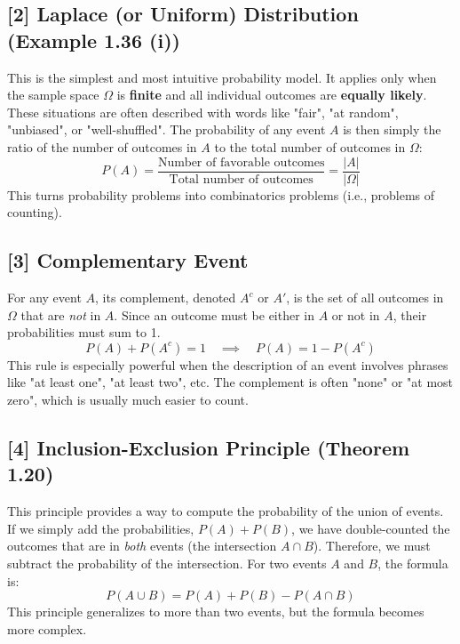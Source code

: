 \documentclass[11pt,a4paper]{article}
\begin{document}
\hypertarget{concept:laplace}{}
\subsection*{[2] Laplace (or Uniform) Distribution (Example 1.36 (i))}
This is the simplest and most intuitive probability model. It applies only when the sample space $\Omega$ is \textbf{finite} and all individual outcomes are \textbf{equally likely}. These situations are often described with words like "fair", "at random", "unbiased", or "well-shuffled".
The probability of any event $A$ is then simply the ratio of the number of outcomes in $A$ to the total number of outcomes in $\Omega$:
\[ P(A) = \frac{\text{Number of favorable outcomes}}{\text{Total number of outcomes}} = \frac{|A|}{|\Omega|} \]
This turns probability problems into combinatorics problems (i.e., problems of counting).

\hypertarget{concept:complement}{}
\subsection*{[3] Complementary Event}
For any event $A$, its complement, denoted $A^c$ or $A'$, is the set of all outcomes in $\Omega$ that are \textit{not} in $A$. Since an outcome must be either in $A$ or not in $A$, their probabilities must sum to 1.
\[ P(A) + P(A^c) = 1 \quad \implies \quad P(A) = 1 - P(A^c) \]
This rule is especially powerful when the description of an event involves phrases like "at least one", "at least two", etc. The complement is often "none" or "at most zero", which is usually much easier to count.

\hypertarget{concept:inclusionexclusion}{}
\subsection*{[4] Inclusion-Exclusion Principle (Theorem 1.20)}
This principle provides a way to compute the probability of the union of events. If we simply add the probabilities, $P(A) + P(B)$, we have double-counted the outcomes that are in \textit{both} events (the intersection $A \cap B$). Therefore, we must subtract the probability of the intersection. For two events $A$ and $B$, the formula is:
\[ P(A \cup B) = P(A) + P(B) - P(A \cap B) \]
This principle generalizes to more than two events, but the formula becomes more complex.
\end{document}

